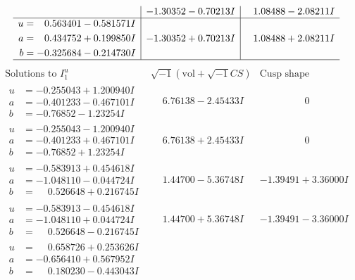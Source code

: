 \documentclass[1p]{elsarticle_modified}
\theoremstyle{definition}
\newcommand{\I}{\sqrt{-1}}
\begin{document}
$$\begin{array}{c|c|c}
 & -1.30352 - 0.70213 I & \phantom{-}1.08488 - 2.08211 I \\ \hline\begin{aligned}
u &= \phantom{-}0.563401 - 0.581571 I \\
a &= \phantom{-}0.434752 + 0.199850 I \\
b &= -0.325684 - 0.214730 I\end{aligned}
 & -1.30352 + 0.70213 I & \phantom{-}1.08488 + 2.08211 I\\
 \hline 
 \end{array}$$\newpage$$\begin{array}{c|c|c}  
\text{Solutions to }I^u_{1}& \I (\text{vol} + \sqrt{-1}CS) & \text{Cusp shape}\\
 \hline 
\begin{aligned}
u &= -0.255043 + 1.200940 I \\
a &= -0.401233 - 0.467101 I \\
b &= -0.76852 - 1.23254 I\end{aligned}
 & \phantom{-}6.76138 - 2.45433 I & \phantom{-0.000000 } 0 \\ \hline\begin{aligned}
u &= -0.255043 - 1.200940 I \\
a &= -0.401233 + 0.467101 I \\
b &= -0.76852 + 1.23254 I\end{aligned}
 & \phantom{-}6.76138 + 2.45433 I & \phantom{-0.000000 } 0 \\ \hline\begin{aligned}
u &= -0.583913 + 0.454618 I \\
a &= -1.048110 - 0.044724 I \\
b &= \phantom{-}0.526648 + 0.216745 I\end{aligned}
 & \phantom{-}1.44700 - 5.36748 I & -1.39491 + 3.36000 I \\ \hline\begin{aligned}
u &= -0.583913 - 0.454618 I \\
a &= -1.048110 + 0.044724 I \\
b &= \phantom{-}0.526648 - 0.216745 I\end{aligned}
 & \phantom{-}1.44700 + 5.36748 I & -1.39491 - 3.36000 I \\ \hline\begin{aligned}
u &= \phantom{-}0.658726 + 0.253626 I \\
a &= -0.656410 + 0.567952 I \\
b &= \phantom{-}0.180230 - 0.443043 I\end{aligned}

\end{array}$$
\end{document}
